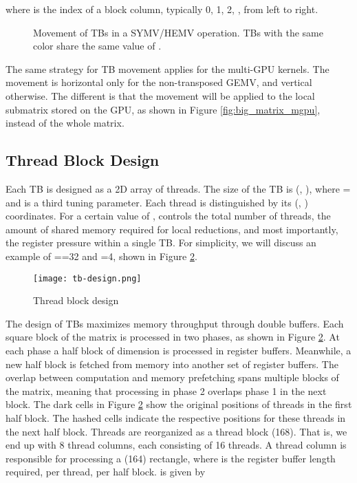 where  is the index of a block column, typically 0, 1, 2, , from left to right. 
\begin{figure}[ht]
\centering
{}
\caption[]{Movement of TBs in a SYMV/HEMV operation. TBs with the same color share the same value of .}
\label{fig:symv_mv}
\end{figure}

The same strategy for TB movement applies for the multi-GPU kernels. The movement is horizontal only for the non-transposed GEMV, 
and vertical otherwise. The different is that the movement will be applied to the local submatrix stored on the GPU, as shown in 
Figure \ref{fig:big_matrix_mgpu}, instead of the whole matrix.  
\subsection{Thread Block Design}
\label{tb_design}
Each TB is designed as a 2D array of threads. The size of the TB is (, ), where = and 
 is a third tuning parameter. Each thread is distinguished by its (, ) coordinates. 
For a certain value of ,  controls the total number of threads, the amount of shared memory required 
for local reductions, and most importantly, the register pressure within a single TB. For simplicity, we will discuss an example 
of ==32 and =4, shown in Figure \ref{fig:tb_design}. 

\begin{figure}[ht]
\centering
\texttt{[image: tb-design.png]}
\caption[]{Thread block design}
\label{fig:tb_design}
\end{figure}

The design of TBs maximizes memory throughput through double buffers. Each square block of the matrix is processed in two phases, as 
shown in Figure \ref{fig:tb_design}. At each phase a half block of dimension  is processed in register buffers. 
Meanwhile, a new half block is fetched from memory into another set of register buffers. The overlap between computation and memory prefetching 
spans multiple blocks of the matrix, meaning that processing in phase 2 overlaps phase 1 in the next block. 
The dark cells in Figure \ref{fig:tb_design} show the original positions of threads in the first half block. The hashed cells indicate the respective positions for 
these threads in the next half block. 
Threads are reorganized as a  thread block (168). That is, we end up with 8 thread columns, each 
consisting of 16 threads. A thread column is responsible for processing a  (164) rectangle, 
where  is the register buffer length required, per thread, per half block.  is given by

